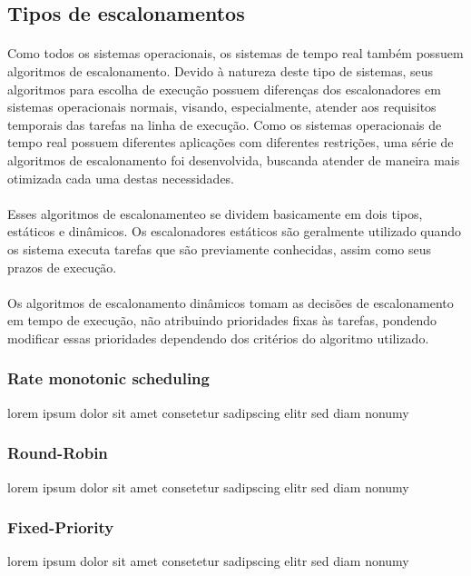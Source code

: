 \subsection{Tipos de escalonamentos}
\paragraph{}
Como todos os sistemas operacionais, os sistemas de tempo real também possuem algoritmos de escalonamento.
Devido à natureza deste tipo de sistemas, seus algoritmos para escolha de execução possuem diferenças
dos escalonadores em sistemas operacionais normais, visando, especialmente, atender aos requisitos temporais
das tarefas na linha de execução. Como os sistemas operacionais de tempo real possuem diferentes aplicações
com diferentes restrições, uma série de algoritmos de escalonamento foi desenvolvida, buscanda atender de
maneira mais otimizada cada uma destas necessidades.
\paragraph{}
Esses algoritmos de escalonamenteo se dividem basicamente em dois tipos, estáticos e dinâmicos.
Os escalonadores estáticos são geralmente utilizado quando os sistema executa tarefas que são previamente
conhecidas, assim como seus prazos de execução.
\paragraph{}
Os algoritmos de escalonamento dinâmicos tomam as decisões de escalonamento em tempo de execução, não
atribuindo prioridades fixas às tarefas, pondendo modificar essas prioridades dependendo dos critérios
do algoritmo utilizado.

\subsubsection{Rate monotonic scheduling}
lorem ipsum dolor sit amet consetetur sadipscing elitr sed diam nonumy

\subsubsection{Round-Robin}
lorem ipsum dolor sit amet consetetur sadipscing elitr sed diam nonumy

\subsubsection{Fixed-Priority}
lorem ipsum dolor sit amet consetetur sadipscing elitr sed diam nonumy


